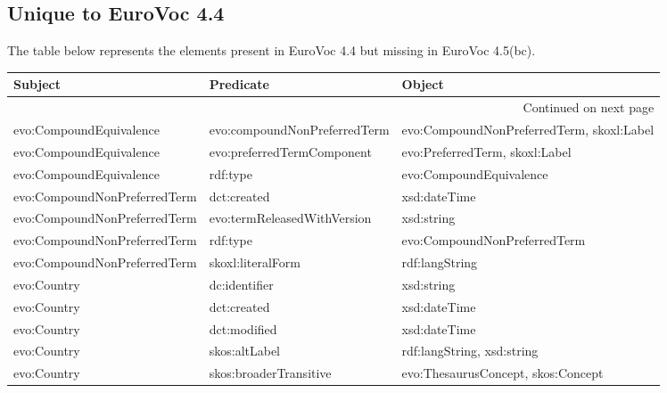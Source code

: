 \documentclass[10pt,a4paper,titlepage,final]{article}
\begin{document}
\subsection{Unique to EuroVoc 4.4}
The table below represents the elements present in EuroVoc 4.4 but missing in EuroVoc 4.5(bc).
\begin{tabularx}{\textwidth}{llX}
\toprule
                      Subject &                     Predicate &                                             Object \\
\midrule
\endhead
\midrule
\multicolumn{3}{r}{{Continued on next page}} \\
\midrule
\endfoot

\bottomrule
\endlastfoot
      evo:CompoundEquivalence &  evo:compoundNonPreferredTerm &          evo:CompoundNonPreferredTerm, skoxl:Label \\
      evo:CompoundEquivalence &    evo:preferredTermComponent &                     evo:PreferredTerm, skoxl:Label \\
      evo:CompoundEquivalence &                      rdf:type &                            evo:CompoundEquivalence \\
 evo:CompoundNonPreferredTerm &                   dct:created &                                       xsd:dateTime \\
 evo:CompoundNonPreferredTerm &   evo:termReleasedWithVersion &                                         xsd:string \\
 evo:CompoundNonPreferredTerm &                      rdf:type &                       evo:CompoundNonPreferredTerm \\
 evo:CompoundNonPreferredTerm &             skoxl:literalForm &                                     rdf:langString \\
                  evo:Country &                 dc:identifier &                                         xsd:string \\
                  evo:Country &                   dct:created &                                       xsd:dateTime \\
                  evo:Country &                  dct:modified &                                       xsd:dateTime \\
                  evo:Country &                 skos:altLabel &                         rdf:langString, xsd:string \\
                  evo:Country &        skos:broaderTransitive &                 evo:ThesaurusConcept, skos:Concept \\

\end{tabularx}
\end{document}
